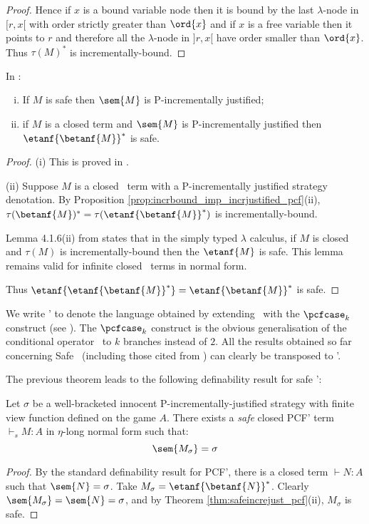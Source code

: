 \begin{proof}
Hence if $x$ is a bound variable node then it is bound by the
last $\lambda$-node in $[r,x[$ with order strictly greater than
$\ord{x}$ and if $x$ is a free variable then it points to $r$ and
therefore all the $\lambda$-node in $]r,x[$ have order smaller than
$\ord{x}$. Thus $\tau(M)^*$ is incrementally-bound.

\end{proof}

\begin{theorem}
\label{thm:safeincrejust_pcf} In \pcf:
\begin{enumerate}[(i)]
\item If $M$ is safe then $\sem{M}$ is P-incrementally justified;
\item if $M$ is a closed term and $\sem{M}$ is
  P-incrementally justified then $\etanf{\betanf{M}}^*$ is safe.
\end{enumerate}
\end{theorem}
\begin{proof}
\noindent(i)
This is proved in  \cite[Theorem 4.2.10]{blumtransfer}.

\noindent(ii) Suppose $M$ is a closed \pcf\ term with a P-incrementally justified strategy denotation. By Proposition \ref{prop:incrbound_imp_incrjustified_pcf}(ii), $\tau(\betanf{M})^* = \tau(\etanf{\betanf{M}}^*)$ is incrementally-bound.

Lemma 4.1.6(ii) from \cite{blumtransfer} states that in the simply typed $\lambda$ calculus, if $M$ is closed and $\tau(M)$ is incrementally-bound then the $\etanf{M}$ is safe.
This lemma remains valid for infinite closed \pcf\ terms in normal form.

Thus $\etanf{\etanf{\betanf{M}}^*} = \etanf{\betanf{M}}^*$ is safe.
\end{proof}


We write \pcf' to denote the language obtained by extending \pcf\
with the $\pcfcase_k$ construct (see \cite{Abr02}).
The $\pcfcase_k$ construct is the obvious generalisation of the
conditional operator \pcfcond\ to $k$ branches instead of $2$. All the results obtained so far concerning Safe \pcf\ (including those
cited from \cite{blumtransfer}) can clearly be transposed to \pcf'.

The previous theorem leads to the following definability result for safe \pcf':
\begin{proposition}
\label{prop:safetydefinability}
Let $\sigma$ be a well-bracketed innocent
P-incrementally-justified strategy with finite view function defined on the game $A$. There exists a \emph{safe} closed PCF' term $\vdash_s M : A$ in $\eta$-long normal form such that:
$$ \sem{M_\sigma} = \sigma $$
\end{proposition}
\begin{proof}
By the standard definability result for PCF', there is a closed term $\vdash N : A$ such that $\sem{N} = \sigma$.
Take $M_\sigma = \etanf{\betanf{N}}^*$.
Clearly $\sem{ M_\sigma} = \sem{N} = \sigma$, and by Theorem \ref{thm:safeincrejust_pcf}(ii), $M_\sigma$ is safe.
\end{proof}


